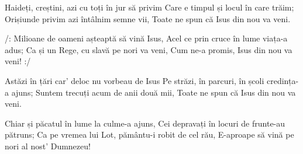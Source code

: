 \beginverse
Haideți, creștini, azi cu toți în jur să privim
Care e timpul și locul în care trăim;
Orișiunde privim azi întâlnim semne vii,
Toate ne spun că Isus din nou va veni.
\endverse

\beginchorus
/: Milioane de oameni așteaptă să vină Isus,
Acel ce prin cruce în lume viața-a adus;
Ca și un Rege, cu slavă pe nori va veni,
Cum ne-a promis, Isus din nou va veni! :/
\endchorus

\beginverse
Astăzi în țări car' deloc nu vorbeau de Isus
Pe străzi, în parcuri, în școli credința-a ajuns;
Suntem trecuți acum de anii două mii,
Toate ne spun că Isus din nou va veni.
\endverse

\beginverse
Chiar și păcatul în lume la culme-a ajuns,
Cei depravați în locuri de frunte-au pătruns;
Ca pe vremea lui Lot, pământu-i robit de cel rău,
E-aproape să vină pe nori al nost' Dumnezeu!
\endverse
\endsong